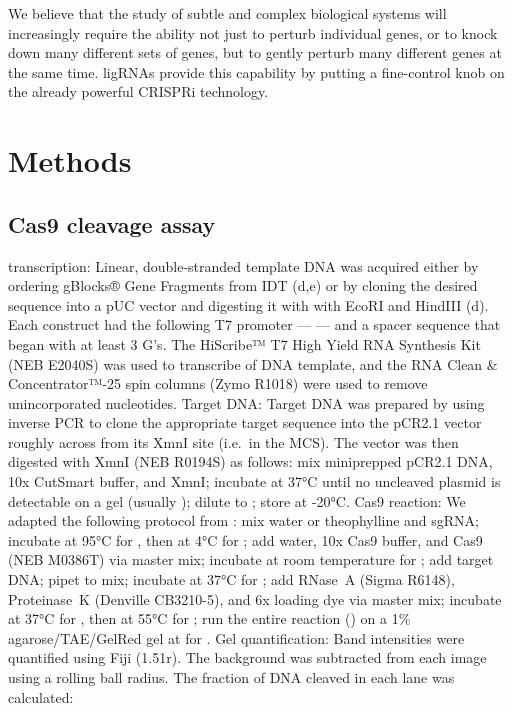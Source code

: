 \documentclass[10pt,oneside]{article}
\begin{document}
We believe that the study of subtle and complex biological systems will increasingly require the ability not just to perturb individual genes, or to knock down many different sets of genes, but to gently perturb many different genes at the same time.  ligRNAs provide this capability by putting a fine-control knob on the already powerful CRISPRi technology.

\section{Methods}

\subsection{\Invitro{} Cas9 cleavage assay}

\Invitro{} transcription: Linear, double-stranded template DNA was acquired either by ordering gBlocks® Gene Fragments from IDT (d,e) or by cloning the desired sequence into a pUC vector and digesting it with with EcoRI and HindIII (d).  Each construct had the following T7 promoter ---  --- and a spacer sequence that began with at least 3 G's.  The HiScribe™ T7 High Yield RNA Synthesis Kit (NEB E2040S) was used to transcribe  of DNA template, and the RNA Clean \& Con\-cen\-trator™-25 spin columns (Zymo R1018) were used to remove unincorporated nucleotides.  Target DNA: Target DNA was prepared by using inverse PCR to clone the appropriate target sequence into the pCR2.1 vector roughly across from its XmnI site (i.e.\ in the MCS).  The vector was then digested with XmnI (NEB R0194S) as follows: mix   miniprepped pCR2.1 DNA,  10x CutSmart buffer, and   XmnI; incubate at 37°C until no uncleaved plasmid is detectable on a gel (usually ); dilute to ; store at -20°C.  Cas9 reaction: We adapted the following protocol from : mix  water or  theophylline and   sgRNA; incubate at 95°C for , then at 4°C for ; add  water,  10x Cas9 buffer, and   Cas9 (NEB M0386T) via master mix; incubate at room temperature for ; add   target DNA; pipet to mix; incubate at 37°C for ; add   RNase~A (Sigma R6148),   Proteinase~K (Denville CB3210-5), and  6x loading dye via master mix; incubate at 37°C for , then at 55°C for ; run the entire reaction () on a 1\% agarose/TAE/GelRed gel at  for .  Gel quantification: Band intensities were quantified using Fiji (1.51r).  The background was subtracted from each image using a  rolling ball radius.  The fraction of DNA cleaved in each lane was calculated:
\end{document}
